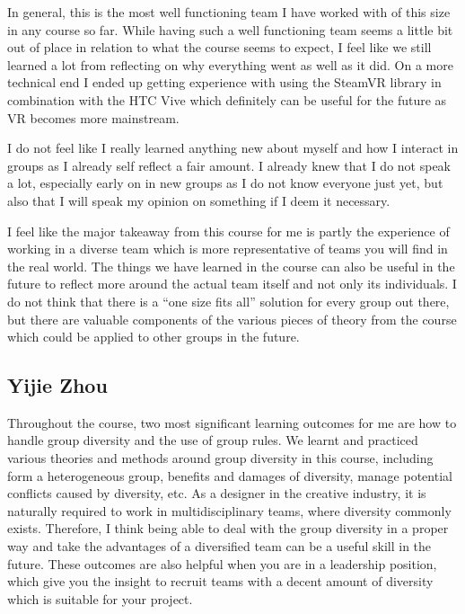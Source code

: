 In general, this is the most well functioning team I have worked with of this size in any course so far. While having such a well functioning team seems a little bit out of place in relation to what the course seems to expect, I feel like we still learned a lot from reflecting on why everything went as well as it did. On a more technical end I ended up getting experience with using the SteamVR library in combination with the HTC Vive which definitely can be useful for the future as VR becomes more mainstream. 

I do not feel like I really learned anything new about myself and how I interact in groups as I already self reflect a fair amount. I already knew that I do not speak a lot, especially early on in new groups as I do not know everyone just yet, but also that I will speak my opinion on something if I deem it necessary. 

I feel like the major takeaway from this course for me is partly the experience of working in a diverse team which is more representative of teams you will find in the real world. The things we have learned in the course can also be useful in the future to reflect more around the actual team itself and not only its individuals. I do not think that there is a “one size fits all” solution for every group out there, but there are valuable components of the various pieces of theory from the course which could be applied to other groups in the future.

\subsection{Yijie Zhou}
Throughout the course, two most significant learning outcomes for me are how to handle group diversity and the use of group rules. We learnt and practiced various theories and methods around group diversity in this course, including form a heterogeneous group, benefits and damages of diversity, manage potential conflicts caused by diversity, etc. As a designer in the creative industry, it is naturally required to work in multidisciplinary teams, where diversity commonly exists. Therefore, I think being able to deal with the group diversity in a proper way and take the advantages of a diversified team can be a useful skill in the future. These outcomes are also helpful when you are in a leadership position, which give you the insight to recruit teams with a decent amount of diversity which is suitable for your project. 

